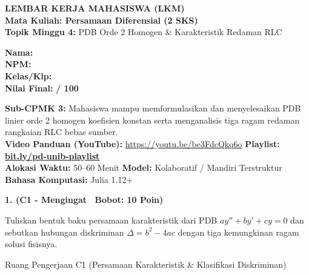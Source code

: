 \documentclass[10pt,a4paper]{article}
\begin{document}
\noindent\begin{minipage}[c]{0.68\textwidth}%
  {\large\textbf{\color{unibblue}LEMBAR KERJA MAHASISWA (LKM)}}\\[1mm]
  {\normalsize\textbf{Mata Kuliah: Persamaan Diferensial (2 SKS)}}\\[0.5mm]
  {\small\textbf{Topik Minggu 4:} PDB Orde 2 Homogen \& Karakteristik Redaman RLC}%
\end{minipage}%
\hfill%
\begin{minipage}[c]{0.30\textwidth}%
  \begin{tcolorbox}[colback=unibblue!5,colframe=unibblue,boxrule=0.6pt,arc=2pt,left=4pt,right=4pt,top=2pt,bottom=2pt]
    \scriptsize
    \textbf{Nama:} \dotfill\\[1.2mm]
    \textbf{NPM:} \dotfill\\[1.2mm]
    \textbf{Kelas/Klp:} \dotfill\\[1.2mm]
    \textbf{Nilai Final:} \hfill \textbf{/ 100}
  \end{tcolorbox}%
\end{minipage}\par

\vspace{1.5mm}

\begin{tcolorbox}[colback=boxbg,colframe=unibgold!90!black,boxrule=0.6pt,arc=2pt,left=5pt,right=5pt,top=3pt,bottom=3pt,title=\textbf{\scriptsize Capaian Pembelajaran (Sub-CPMK 3) \& Pedoman Evaluasi OBE}]
  \scriptsize
  \textbf{Sub-CPMK 3:} Mahasiswa mampu memformulasikan dan menyelesaikan PDB linier orde 2 homogen koefisien konstan serta menganalisis tiga ragam redaman rangkaian RLC bebas sumber.\\
  \textbf{Video Panduan (YouTube):} \url{https://youtu.be/be3FdcQkq6o} \hfill \textbf{Playlist:} \href{https://www.youtube.com/playlist?list=PLS5oOZWXZeTw}{\color{unibblue}\textbf{bit.ly/pd-unib-playlist}}\\\textbf{Alokasi Waktu:} 50--60 Menit \quad\textbar\quad \textbf{Model:} Kolaboratif / Mandiri Terstruktur \quad\textbar\quad \textbf{Bahasa Komputasi:} Julia 1.12+
\end{tcolorbox}

\vspace{1mm}

\noindent\textbf{1. (C1 - Mengingat \textbar\ Bobot: 10 Poin)}\par\vspace{0.5mm}
{\footnotesize Tuliskan bentuk baku persamaan karakteristik dari PDB $a y'' + b y' + c y = 0$ dan sebutkan hubungan diskriminan $\Delta = b^2 - 4ac$ dengan tiga kemungkinan ragam solusi fisisnya.}
\begin{answerbox}{Ruang Pengerjaan C1 (Persamaan Karakteristik \& Klasifikasi Diskriminan)}
  \vspace{2.0cm}
\end{answerbox}
\end{document}
